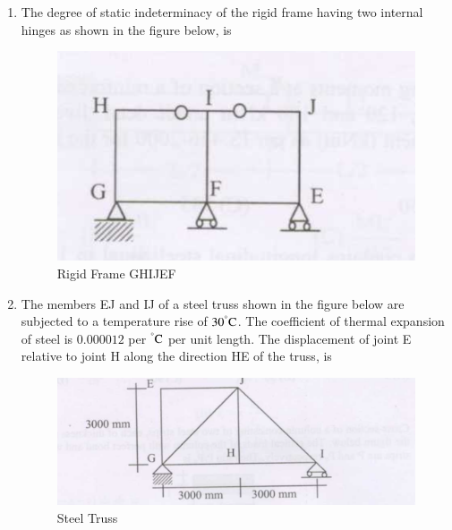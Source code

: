 \documentclass[journal]{IEEEtran}
\begin{document}
\begin{enumerate}
\item The degree of static indeterminacy of the rigid frame having two internal hinges as shown in the figure below, is \hfill {}


\begin{figure}[H]
    \centering
    \includegraphics[width=0.6\columnwidth]{figs/fig6.png} 
    \caption{Rigid Frame GHIJEF}
    \label{fig:placeholder}
\end{figure}

\begin{enumerate}
\end{enumerate}



\item The members EJ and IJ of a steel truss shown in the figure below are subjected to a temperature rise of $30^\degree\text{C}$. The coefficient of thermal expansion of steel is $0.000012$ per $^\degree\text{C}$ per unit length. The displacement  of joint E relative to joint H along the direction HE of the truss, is \hfill {}
\begin{figure}[H]
    \centering
    \includegraphics[width=0.6\columnwidth]{figs/fig7.png} 
    \caption{Steel Truss}
    \label{fig:placeholder}
\end{figure}
\begin{enumerate}
\end{enumerate}


\end{enumerate}
\end{document}
